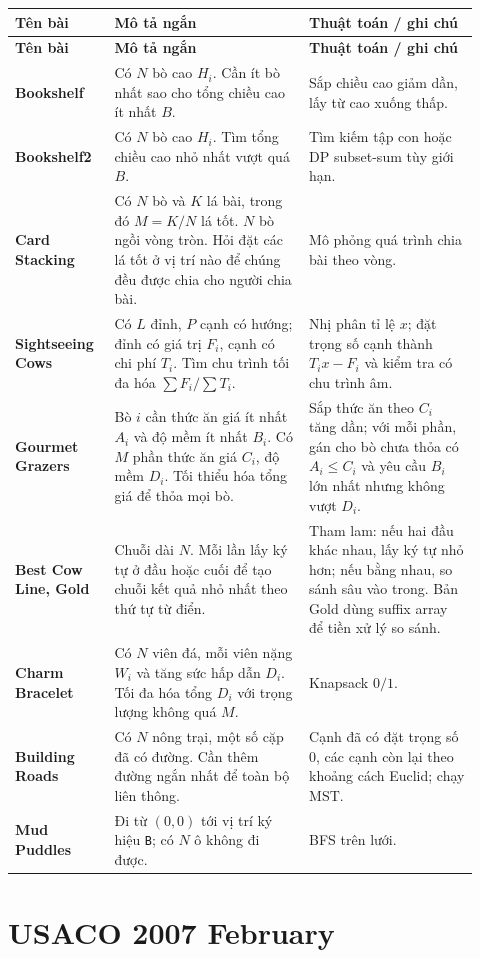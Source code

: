 \documentclass[11pt]{article}
\newenvironment{solutiontable}{%
  \small
  \setlength{\tabcolsep}{4pt}
  \renewcommand{\arraystretch}{1.14}
  \begin{longtable}{L{0.19\linewidth}L{0.39\linewidth}L{0.34\linewidth}}
  \toprule
  \textbf{Tên bài} & \textbf{Mô tả ngắn} & \textbf{Thuật toán / ghi chú}\\
  \midrule
  \endfirsthead
  \toprule
  \textbf{Tên bài} & \textbf{Mô tả ngắn} & \textbf{Thuật toán / ghi chú}\\
  \midrule
  \endhead
}{%
  \bottomrule
  \end{longtable}
  \normalsize
}
\newcommand{\problemrow}[3]{\textbf{#1} & #2 & #3\\\midrule}
\begin{document}
\begin{solutiontable}
\problemrow{Bookshelf}{Có \(N\) bò cao \(H_i\). Cần ít bò nhất sao cho tổng chiều cao ít nhất \(B\).}{Sắp chiều cao giảm dần, lấy từ cao xuống thấp.}
\problemrow{Bookshelf2}{Có \(N\) bò cao \(H_i\). Tìm tổng chiều cao nhỏ nhất vượt quá \(B\).}{Tìm kiếm tập con hoặc DP subset-sum tùy giới hạn.}
\problemrow{Card Stacking}{Có \(N\) bò và \(K\) lá bài, trong đó \(M=K/N\) lá tốt. \(N\) bò ngồi vòng tròn. Hỏi đặt các lá tốt ở vị trí nào để chúng đều được chia cho người chia bài.}{Mô phỏng quá trình chia bài theo vòng.}
\problemrow{Sightseeing Cows}{Có \(L\) đỉnh, \(P\) cạnh có hướng; đỉnh có giá trị \(F_i\), cạnh có chi phí \(T_i\). Tìm chu trình tối đa hóa \(\sum F_i/\sum T_i\).}{Nhị phân tỉ lệ \(x\); đặt trọng số cạnh thành \(T_i x-F_i\) và kiểm tra có chu trình âm.}
\problemrow{Gourmet Grazers}{Bò \(i\) cần thức ăn giá ít nhất \(A_i\) và độ mềm ít nhất \(B_i\). Có \(M\) phần thức ăn giá \(C_i\), độ mềm \(D_i\). Tối thiểu hóa tổng giá để thỏa mọi bò.}{Sắp thức ăn theo \(C_i\) tăng dần; với mỗi phần, gán cho bò chưa thỏa có \(A_i\le C_i\) và yêu cầu \(B_i\) lớn nhất nhưng không vượt \(D_i\).}
\problemrow{Best Cow Line, Gold}{Chuỗi dài \(N\). Mỗi lần lấy ký tự ở đầu hoặc cuối để tạo chuỗi kết quả nhỏ nhất theo thứ tự từ điển.}{Tham lam: nếu hai đầu khác nhau, lấy ký tự nhỏ hơn; nếu bằng nhau, so sánh sâu vào trong. Bản Gold dùng suffix array để tiền xử lý so sánh.}
\problemrow{Charm Bracelet}{Có \(N\) viên đá, mỗi viên nặng \(W_i\) và tăng sức hấp dẫn \(D_i\). Tối đa hóa tổng \(D_i\) với trọng lượng không quá \(M\).}{Knapsack \(0/1\).}
\problemrow{Building Roads}{Có \(N\) nông trại, một số cặp đã có đường. Cần thêm đường ngắn nhất để toàn bộ liên thông.}{Cạnh đã có đặt trọng số \(0\), các cạnh còn lại theo khoảng cách Euclid; chạy MST.}
\problemrow{Mud Puddles}{Đi từ \((0,0)\) tới vị trí ký hiệu \texttt{B}; có \(N\) ô không đi được.}{BFS trên lưới.}
\end{solutiontable}

\section{USACO 2007 February}
\end{document}
